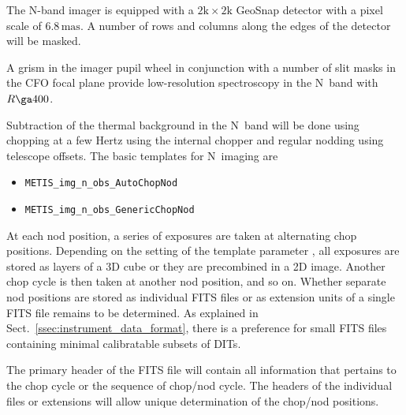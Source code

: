 The N-band imager is equipped with a $2\mathrm{k}\times 2\mathrm{k}$
GeoSnap detector with a pixel scale of $6.8\,\mathrm{mas}$. A number
of rows and columns along the edges of the detector will be masked.

A grism in the imager pupil wheel in conjunction with a number of slit
masks in the CFO focal plane provide low-resolution spectroscopy in
the N~band with $R\ga 400$.

Subtraction of the thermal background in the N~band will be done using
chopping at a few Hertz using the internal chopper and regular nodding
using telescope offsets. The basic templates for N~imaging are
\begin{itemize}
\item \lstinline{METIS_img_n_obs_AutoChopNod}
\item \lstinline{METIS_img_n_obs_GenericChopNod}
\end{itemize}

At each nod position, a series of exposures are taken at alternating
chop positions. Depending on the setting of the template parameter
, all exposures are stored as layers of a 3D cube
or they are precombined in a 2D image. Another chop cycle is then
taken at another nod position, and so on. Whether separate nod
positions are stored as individual FITS files or as extension units of
a single FITS file remains to be determined. As explained in
Sect.~\ref{ssec:instrument_data_format}, there is a preference for
small FITS files containing minimal calibratable subsets of DITs.

The primary header of the FITS file will contain all information that
pertains to the chop cycle or the sequence of chop/nod cycle. The
headers of the individual files or extensions will allow unique
determination of the chop/nod positions.

